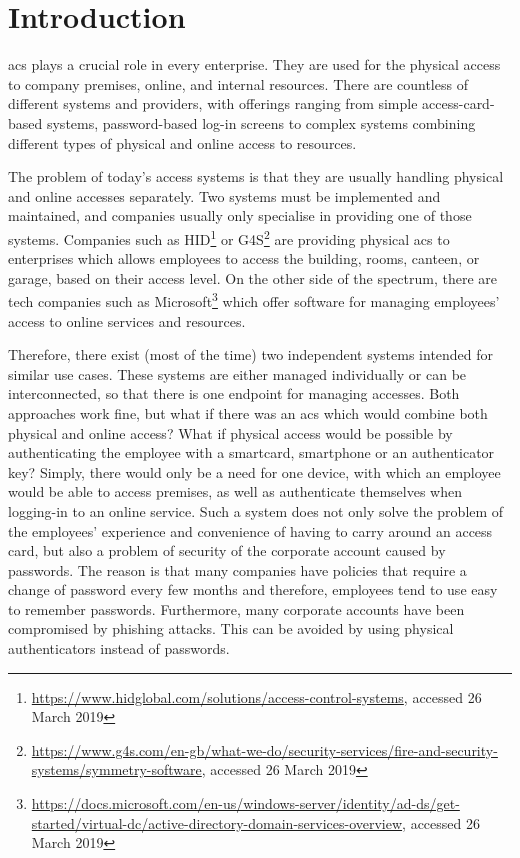 \section{Introduction}
% 
\acrfull{acs} plays a crucial role in every enterprise. They are used for the physical access to company premises, online, and internal resources. There are countless of different systems and providers, with offerings ranging from simple access-card-based systems, password-based log-in screens to complex systems combining different types of physical and online access to resources. 

The problem of today’s access systems is that they are usually handling physical and online accesses separately. Two systems must be implemented and maintained, and companies usually only specialise in providing one of those systems. Companies such as HID\footnote{\url{https://www.hidglobal.com/solutions/access-control-systems}, accessed 26 March 2019} or G4S\footnote{\url{https://www.g4s.com/en-gb/what-we-do/security-services/fire-and-security-systems/symmetry-software}, accessed 26 March 2019} are providing physical \acrshort{acs} to enterprises which allows employees to access the building, rooms, canteen, or garage, based on their access level. On the other side of the spectrum, there are tech companies such as Microsoft\footnote{\url{https://docs.microsoft.com/en-us/windows-server/identity/ad-ds/get-started/virtual-dc/active-directory-domain-services-overview}, accessed 26 March 2019} which offer software for managing employees’ access to online services and resources.

Therefore, there exist (most of the time) two independent systems intended for similar use cases. These systems are either managed individually or can be interconnected, so that there is one endpoint for managing accesses. Both approaches work fine, but what if there was an \acrshort{acs} which would combine both physical and online access? What if physical access would be possible by authenticating the employee with a smartcard, smartphone or an authenticator key? Simply, there would only be a need for one device, with which an employee would be able to access premises, as well as authenticate themselves when logging-in to an online service. Such a system does not only solve the problem of the employees’ experience and convenience of having to carry around an access card, but also a problem of security of the corporate account caused by passwords. The reason is that many companies have policies that require a change of password every few months and therefore, employees tend to use easy to remember passwords. Furthermore, many corporate accounts have been compromised by phishing attacks\cite{Kessem2017CanadianAttacks}. This can be avoided by using physical authenticators instead of passwords.

